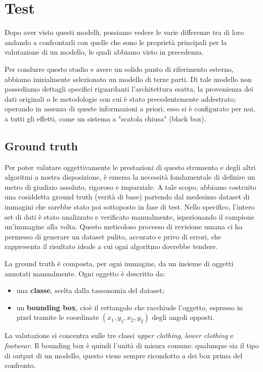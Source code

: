 \chapter{Test}

Dopo aver visto questi modelli, possiamo vedere le varie differenze tra di loro andando a confrontarli
con quelle che sono le proprietà principali per la valutazione di un modello, le quali abbiamo visto in precedenza.

\noindent
Per condurre questo studio e avere un solido punto di riferimento esterno, abbiamo inizialmente selezionato un modello di terze parti. Di tale modello non possediamo dettagli specifici riguardanti l'architettura esatta,
la provenienza dei dati originali o le metodologie con cui è stato precedentemente addestrato; operando in assenza di queste informazioni a priori, esso si è configurato per noi, a tutti gli effetti,
come un sistema a "scatola chiusa" (black box).

\section{Ground truth}

\noindent
Per poter valutare oggettivamente le prestazioni di questo strumento e degli altri algoritmi a nostra disposizione, è emersa la necessità fondamentale di definire un metro di giudizio assoluto, rigoroso e imparziale.
A tale scopo, abbiamo costruito una cosiddetta ground truth (verità di base) partendo dal medesimo dataset di immagini che sarebbe stato poi sottoposto in fase di test. Nello specifico,
l'intero set di dati è stato analizzato e verificato manualmente, ispezionando il campione un'immagine alla volta. Questo meticoloso processo di revisione umana ci ha permesso di generare un dataset pulito,
accurato e privo di errori, che rappresenta il risultato ideale a cui ogni algoritmo dovrebbe tendere.

\noindent
La ground truth è composta, per ogni immagine, da un insieme di oggetti annotati manualmente. Ogni oggetto è descritto da:
\begin{itemize}
  \item una \textbf{classe}, scelta dalla tassonomia del dataset;
  \item un \textbf{bounding box}, cioè il rettangolo che racchiude l'oggetto, espresso in pixel tramite le coordinate $(x_1, y_1, x_2, y_2)$ degli angoli opposti.
\end{itemize}

\noindent
La valutazione si concentra sulle tre classi \textit{upper clothing}, \textit{lower clothing} e \textit{footwear}. Il bounding box è quindi l'unità di misura comune:
qualunque sia il tipo di output di un modello, questo viene sempre ricondotto a dei box prima del confronto.

